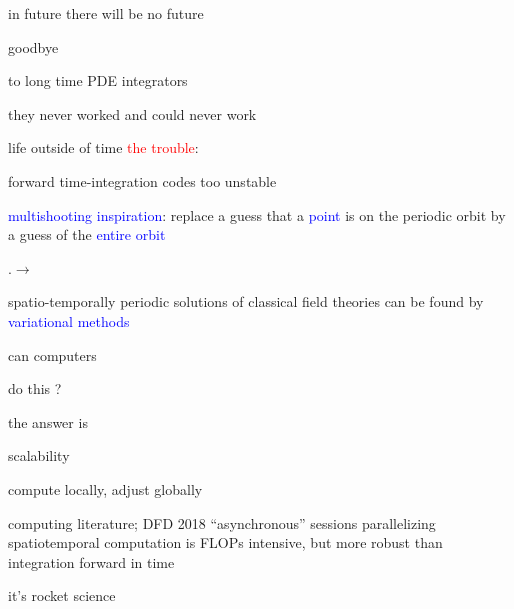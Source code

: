 \begin{frame}{in future there will be no future}
\begin{center}
{\huge goodbye}
\end{center}

\vfill

to long time PDE integrators

\medskip

\hfill they never worked and could never work
\end{frame}

\begin{frame}{life outside of time}
\textcolor{red}{the trouble}:

forward time-integration codes too unstable

\bigskip
\bigskip

\textcolor{blue}{multishooting inspiration}:
 replace a guess that a  \textcolor{blue}{point} is on the periodic
orbit by a guess of the \textcolor{blue}{entire orbit}

\bigskip

.\qquad\qquad$\to$

\bigskip

spatio-temporally periodic solutions of classical field theories
can be found by \textcolor{blue}{variational methods}
\end{frame}

\begin{frame}{can computers}

\vfill

{\Huge
do this ?
                  }

\vfill

\end{frame}


\begin{frame}{the answer is}

\vfill

{\Huge
scalability
                  }

\vfill

\end{frame}

\begin{frame}{compute locally, adjust globally}
\begin{block}{computing literature; DFD 2018 ``asynchronous'' sessions}
parallelizing {\color{red}spatiotemporal}
computation is FLOPs intensive, but more robust than
integration forward in time
\end{block}

\vfill\hfill
it's rocket science
\end{frame}

